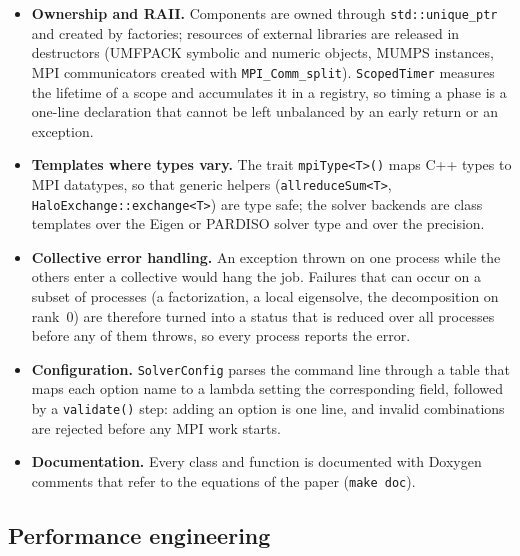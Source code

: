\documentclass[11pt,a4paper]{article}
\begin{document}
\begin{itemize}
\item \textbf{Ownership and RAII.} Components are owned through \texttt{std::unique\_ptr} and created by
  factories; resources of external libraries are released in destructors (UMFPACK symbolic and numeric
  objects, MUMPS instances, MPI communicators created with \texttt{MPI\_Comm\_split}). \texttt{ScopedTimer}
  measures the lifetime of a scope and accumulates it in a registry, so timing a phase is a one-line
  declaration that cannot be left unbalanced by an early return or an exception.
\item \textbf{Templates where types vary.} The trait \texttt{mpiType<T>()} maps C++ types to MPI datatypes,
  so that generic helpers (\texttt{allreduceSum<T>}, \texttt{HaloExchange::exchange<T>}) are type safe; the
  solver backends are class templates over the Eigen or PARDISO solver type and over the precision.
\item \textbf{Collective error handling.} An exception thrown on one process while the others enter a
  collective would hang the job. Failures that can occur on a subset of processes (a factorization, a local
  eigensolve, the decomposition on rank~0) are therefore turned into a status that is reduced over all
  processes before any of them throws, so every process reports the error.
\item \textbf{Configuration.} \texttt{SolverConfig} parses the command line through a table that maps each
  option name to a lambda setting the corresponding field, followed by a \texttt{validate()} step: adding an
  option is one line, and invalid combinations are rejected before any MPI work starts.
\item \textbf{Documentation.} Every class and function is documented with Doxygen comments that refer to the
  equations of the paper (\texttt{make doc}).
\end{itemize}

\subsection{Performance engineering}\label{sec:perfeng}
\end{document}
